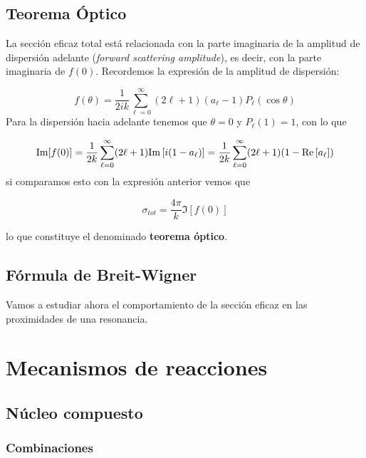 \subsection{Teorema Óptico}
La sección eficaz total está relacionada con la parte imaginaria de la amplitud de dispersión adelante (\textit{forward scattering amplitude}), es decir, con la parte imaginaria de $f(0)$. Recordemos la expresión de la amplitud de dispersión:

\begin{equation}
	f(\theta) = \frac{1}{2ik} \sum_{\ell = 0}^{\infty} (2\ell +1 ) (a_{\ell}-1)P_{\ell} (\cos \theta)
\end{equation}
Para la dispersión hacia adelante tenemos que $\theta=0$ y $P_\ell (1)=1$, con lo que

\begin{equation}
	\mathrm{Im} [f(0)] = \frac{1}{2k} \sum_{\ell=0}^{\infty} (2\ell + 1) \mathrm{Im} \left[ i(1-a_\ell) \right] = \frac{1}{2k} \sum_{\ell=0}^{\infty} (2\ell+1) (1-\mathrm{Re} \left[ a_\ell \right])
\end{equation}
si comparamos esto con la expresión anterior vemos que

\begin{mybox}
	\begin{equation}
		\sigma_{tot} = \frac{4\pi}{k} \Im [f(0)]
	\end{equation}
\end{mybox}
lo que constituye el denominado \textbf{teorema óptico}.

\subsection{Fórmula de Breit-Wigner}

Vamos a estudiar ahora el comportamiento de la sección eficaz en las proximidades de una resonancia.

\section{Mecanismos de reacciones}

\subsection{Núcleo compuesto}

\subsubsection{Combinaciones}

